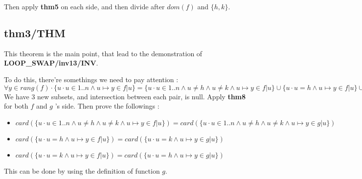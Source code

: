 Then apply \textbf{thm5} on each side, and then divide after $dom(f)$ and $\{h,k\}$.

\subsection{thm3/THM}
This theorem is the main point, that lead to the demonstration of \textbf{LOOP\_SWAP/inv13/INV}. 

To do this, there're somethings we need to pay attention :\\
$\forall y \in rang(f) \cdot  \{u \cdot u \in 1..n \land  u \mapsto y \in f | u\} = \{u \cdot u \in 1..n \land u \neq h \land u \neq k \land  u \mapsto y \in f | u\} \cup \{u \cdot u=h \land u \mapsto y \in f | u \} \cup \{u \cdot u=k \land u \mapsto y \in f | u \} $ \\
We have 3 new subsets, and intersection between each pair, is null. Apply \textbf{thm8} for both $f$ and $g$ 's side. Then prove the followings : 
\begin{itemize}
\item $card( \{u \cdot u \in 1..n \land u \neq h \land u \neq k \land  u \mapsto y \in f | u\}) = card( \{u \cdot u \in 1..n \land u \neq h \land u \neq k \land  u \mapsto y \in g | u\})$

\item $card(\{u \cdot u=h \land u \mapsto y \in f | u \}) = card(\{u \cdot u=k \land u \mapsto y \in g | u \})$

\item $card(\{u \cdot u=k \land u \mapsto y \in f | u \}) = card(\{u \cdot u=h \land u \mapsto y \in g| u \})$
\end{itemize}

This can be done by using the definition of function $g$. 














